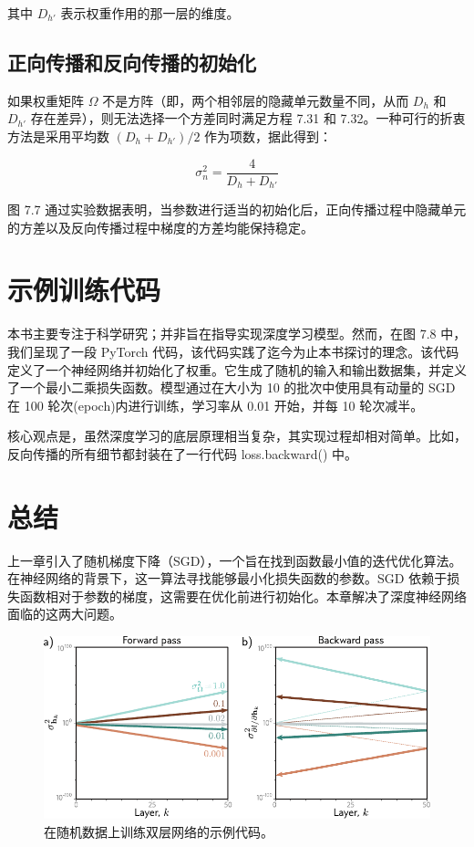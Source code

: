 \documentclass[lang=cn,newtx,10pt,scheme=chinese]{elegantbook}
\begin{document}
其中 \(D_{h'}\) 表示权重作用的那一层的维度。
\subsection{正向传播和反向传播的初始化}
如果权重矩阵 \( \Omega \) 不是方阵（即，两个相邻层的隐藏单元数量不同，从而 \( D_h \) 和 \( D_{h'} \) 存在差异），则无法选择一个方差同时满足方程 7.31 和 7.32。一种可行的折衷方法是采用平均数 \( (D_h + D_{h'})/2 \) 作为项数，据此得到：

\begin{equation}
\sigma^2_n = \frac{4}{D_h + D_{h'}} 
\end{equation}

图 7.7 通过实验数据表明，当参数进行适当的初始化后，正向传播过程中隐藏单元的方差以及反向传播过程中梯度的方差均能保持稳定。

\section{示例训练代码}
本书主要专注于科学研究；并非旨在指导实现深度学习模型。然而，在图 7.8 中，我们呈现了一段 PyTorch 代码，该代码实践了迄今为止本书探讨的理念。该代码定义了一个神经网络并初始化了权重。它生成了随机的输入和输出数据集，并定义了一个最小二乘损失函数。模型通过在大小为 10 的批次中使用具有动量的 SGD 在 100 轮次(epoch)内进行训练，学习率从 0.01 开始，并每 10 轮次减半。

核心观点是，虽然深度学习的底层原理相当复杂，其实现过程却相对简单。比如，反向传播的所有细节都封装在了一行代码 loss.backward()  中。

\section{总结}
上一章引入了随机梯度下降（SGD），一个旨在找到函数最小值的迭代优化算法。在神经网络的背景下，这一算法寻找能够最小化损失函数的参数。SGD 依赖于损失函数相对于参数的梯度，这需要在优化前进行初始化。本章解决了深度神经网络面临的这两大问题。

\begin{figure}[ht!]
\centering
\includegraphics[width=0.7\linewidth]{PDFFigures/UDLChap7PDF/Train2Exploding.pdf}
\caption{在随机数据上训练双层网络的示例代码。}
\end{figure}
\end{document}
